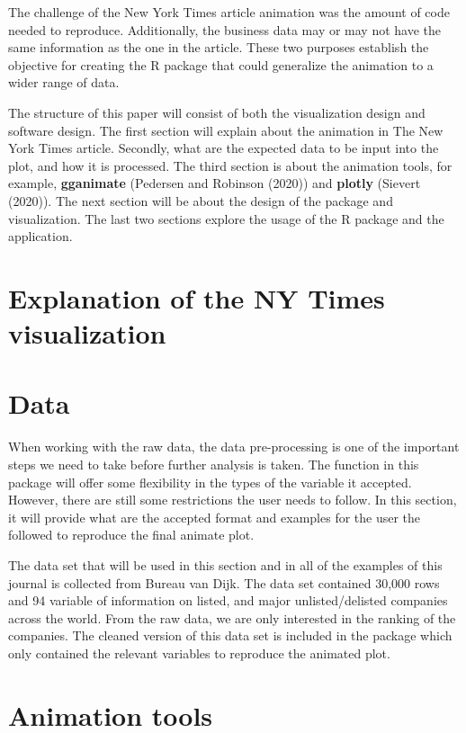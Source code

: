 The challenge of the New York Times article animation was the amount of code needed to reproduce. Additionally, the business data may or may not have the same information as the one in the article. These two purposes establish the objective for creating the R package that could generalize the animation to a wider range of data.

The structure of this paper will consist of both the visualization design and software design. The first section will explain about the animation in The New York Times article. Secondly, what are the expected data to be input into the plot, and how it is processed. The third section is about the animation tools, for example, \textbf{gganimate} (Pedersen and Robinson (2020)) and \textbf{plotly} (Sievert (2020)). The next section will be about the design of the package and visualization. The last two sections explore the usage of the R package and the application.

\hypertarget{explanation-of-the-ny-times-visualization}{%
\section{Explanation of the NY Times visualization}\label{explanation-of-the-ny-times-visualization}}

\hypertarget{data}{%
\section{Data}\label{data}}

When working with the raw data, the data pre-processing is one of the important steps we need to take before further analysis is taken. The function in this package will offer some flexibility in the types of the variable it accepted. However, there are still some restrictions the user needs to follow. In this section, it will provide what are the accepted format and examples for the user the followed to reproduce the final animate plot.

The data set that will be used in this section and in all of the examples of this journal is collected from Bureau van Dijk. The data set contained 30,000 rows and 94 variable of information on listed, and major unlisted/delisted companies across the world. From the raw data, we are only interested in the ranking of the companies. The cleaned version of this data set is included in the package which only contained the relevant variables to reproduce the animated plot.

\hypertarget{animation-tools}{%
\section{Animation tools}\label{animation-tools}}

